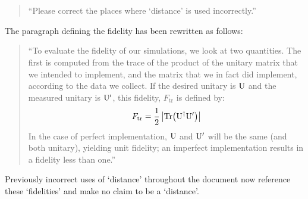 \documentclass[a4paper,11pt]{article}
\begin{document}
\section{}
\begin{quote}
  ``Please correct the places where `distance' is used incorrectly.''
\end{quote}
The paragraph defining the fidelity has been rewritten as follows:
\begin{quote}
  ``To evaluate the fidelity of our simulations, we look at two quantities. The
  first is computed from the trace of the product of the unitary matrix that we
  intended to implement, and the matrix that we in fact did implement, according
  to the data we collect. If the desired unitary is \(\mathrm{U}\) and
  the measured unitary is \(\mathrm{U^{\prime}}\), this fidelity,
  \(F_{\mathrm{tr}}\) is defined by:
  \begin{equation}
    F_{\mathrm{tr}}=\frac{1}{2}\left|\mathrm{Tr}\!\left(\mathrm{U}^{\dagger}{\mathrm{U}^{\prime}}\right)\right|
  \end{equation}
  In the case of perfect implementation, \(\mathrm{U}\) and \(\mathrm{U^{\prime}}\)
  will be the same (and both unitary), yielding unit fidelity; an imperfect
  implementation results in a fidelity less than one.''
\end{quote}
Previously incorrect uses of `distance' throughout the document now reference
these `fidelities' and make no claim to be a `distance'.
\end{document}
